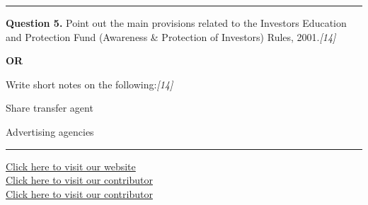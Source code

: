 \documentclass[11pt,a4paper]{article}
\newcommand{\pts}[1]{\hfill   \textit{[#1]}}
\begin{document}
\medskip\rule{\linewidth}{0.2pt}




\noindent   \textbf{Question 5.}
Point out the main provisions related to the Investors Education and Protection Fund (Awareness \& Protection of Investors) Rules, 2001.\pts{14}

\centerline{   \textbf{OR}}

Write short notes on the following:\pts{14}

\begin{parts}
  \item Share transfer agent
  \item Advertising agencies
\end{parts}

\vfill
\rule{\linewidth}{0.4pt}

\begin{center}\small
\href{https://bhu-exam.vercel.app/}{Click here to visit our website}\\[4pt]
\href{https://me-aryan.vercel.app/}{Click here to visit our contributor}\\[4pt]
\href{https://quashan-me.vercel.app/}{Click here to visit our contributor}
\end{center}
\end{document}
